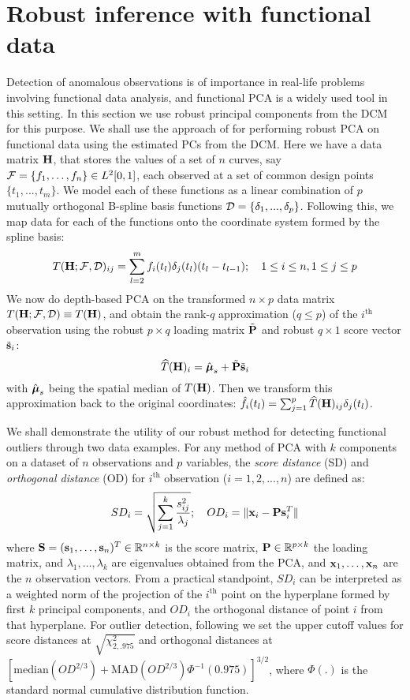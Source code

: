\section{Robust inference with functional data}
\label{section:fpcaSection}

Detection of anomalous observations is of importance in real-life problems involving functional data analysis, and functional PCA is a widely used tool in this setting. In this section we use robust principal components from the DCM for this purpose. We shall use the approach of \cite{BoenteBarrera15} for performing robust PCA on functional data using the estimated PCs from the DCM. Here we have a data matrix ${\mathbf{H}}$, that stores the values of a set of $n$ curves, say $ {\cal{F}} = \{ f_1, \ldots , f_n  \} \in L^2[0,1]$, each observed at a set of common design points $\{ t_1, ..., t_m \} $. We model each of these functions as a linear combination of $p$ mutually orthogonal B-spline basis functions ${\cal{D}} = \{ \delta_1, ..., \delta_p \}$. Following this, we map data for each of the functions onto the coordinate system formed by the spline basis:
%
\begin{equation}
T( {\mathbf{H}}; {\cal{F}}, {\cal{D}})_{ij} = \sum_{l=2}^m f_i(t_l) \delta_j(t_l) (t_l - t_{l-1}); \quad 1 \leq i \leq n, 1 \leq j \leq p
\end{equation}
%
We now do depth-based PCA on the transformed $n \times p$ data matrix $T({\mathbf{H}}; {\cal{F}}, {\cal{D}}) \equiv T({\mathbf{H}})$, and obtain the rank-$q$ approximation ($q \leq p$) of the $i^\text{th}$ observation using the robust $p \times q$ loading matrix $\tilde {{\mathbf{P}}}$ and robust $q \times 1$ score vector $\tilde{{\bf{s}}}_i$:
%
$$ \widehat T({\mathbf{H}})_i = \hat {{\boldsymbol{\mu}}}_{s} + \tilde {{\mathbf{P}}} \tilde {{\bf{s}}}_i $$
%
with $\hat {{\boldsymbol{\mu}}}_{s} $ being the spatial median of $T({\mathbf{H}})$. Then we transform this approximation back to the original coordinates: $\hat f_i (t_l) = \sum_{j=1}^p \widehat T({\mathbf{H}})_{ij} \delta_j (t_l)$.

We shall demonstrate the utility of our robust method for detecting functional outliers through two data examples. For any method of PCA with $k$ components on a dataset of $n$ observations and $p$ variables, the \textit{score distance} (SD) and \textit{orthogonal distance} (OD) for $i^\text{th}$ observation ($i=1,2,...,n$) are defined as:
%
$$
SD_i = \sqrt{ \sum_{j=1}^k \frac{s^2_{ij}}{\lambda_j}}; \quad OD_i = \| {\bf{x}}_i - {\mathbf{P}}{\bf{s}}_i^T \|
$$
%
where ${\mathbf{S}} = ({\bf{s}}_1, \ldots ,{\bf{s}}_n)^T \in {\mathbb{R}}^{n\times k}$ is the score matrix, ${\mathbf{P}} \in {\mathbb{R}}^{p\times k}$ the loading matrix, and $\lambda_1,\ldots ,\lambda_k$ are eigenvalues obtained from the PCA, and ${\bf{x}}_1,\ldots,{\bf{x}}_n$ are the $n$ observation vectors. From a practical standpoint, $SD_i$ can be interpreted as a weighted norm of the projection of the $i^\text{th}$ point on the hyperplane formed by first $k$ principal components, and $OD_i$ the orthogonal distance of point $i$ from that hyperplane. For outlier detection, following \cite{hubert05} we set the upper cutoff values for score distances at $\sqrt{\chi^2_{2,.975}}$ and orthogonal distances at $[\text{median}(OD^{2/3}) + \text{MAD}(OD^{2/3})\Phi^{-1}(0.975)]^{3/2}$, where $\Phi(.)$ is the standard normal cumulative distribution function.

